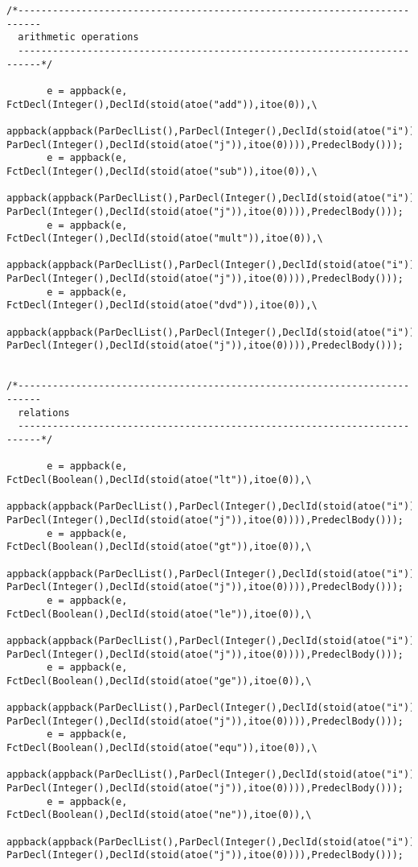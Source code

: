 \begin{verbatim}
/*--------------------------------------------------------------------------
  arithmetic operations 
  --------------------------------------------------------------------------*/

       e = appback(e, FctDecl(Integer(),DeclId(stoid(atoe("add")),itoe(0)),\
 appback(appback(ParDeclList(),ParDecl(Integer(),DeclId(stoid(atoe("i")),itoe(0)))),\
ParDecl(Integer(),DeclId(stoid(atoe("j")),itoe(0)))),PredeclBody()));
       e = appback(e, FctDecl(Integer(),DeclId(stoid(atoe("sub")),itoe(0)),\
 appback(appback(ParDeclList(),ParDecl(Integer(),DeclId(stoid(atoe("i")),itoe(0)))),
ParDecl(Integer(),DeclId(stoid(atoe("j")),itoe(0)))),PredeclBody()));
       e = appback(e, FctDecl(Integer(),DeclId(stoid(atoe("mult")),itoe(0)),\
 appback(appback(ParDeclList(),ParDecl(Integer(),DeclId(stoid(atoe("i")),itoe(0)))),\
ParDecl(Integer(),DeclId(stoid(atoe("j")),itoe(0)))),PredeclBody()));
       e = appback(e, FctDecl(Integer(),DeclId(stoid(atoe("dvd")),itoe(0)),\
 appback(appback(ParDeclList(),ParDecl(Integer(),DeclId(stoid(atoe("i")),itoe(0)))),\
ParDecl(Integer(),DeclId(stoid(atoe("j")),itoe(0)))),PredeclBody()));


/*--------------------------------------------------------------------------
  relations 
  --------------------------------------------------------------------------*/

       e = appback(e, FctDecl(Boolean(),DeclId(stoid(atoe("lt")),itoe(0)),\
 appback(appback(ParDeclList(),ParDecl(Integer(),DeclId(stoid(atoe("i")),itoe(0)))),\
ParDecl(Integer(),DeclId(stoid(atoe("j")),itoe(0)))),PredeclBody()));
       e = appback(e, FctDecl(Boolean(),DeclId(stoid(atoe("gt")),itoe(0)),\
 appback(appback(ParDeclList(),ParDecl(Integer(),DeclId(stoid(atoe("i")),itoe(0)))),\
ParDecl(Integer(),DeclId(stoid(atoe("j")),itoe(0)))),PredeclBody()));
       e = appback(e, FctDecl(Boolean(),DeclId(stoid(atoe("le")),itoe(0)),\
 appback(appback(ParDeclList(),ParDecl(Integer(),DeclId(stoid(atoe("i")),itoe(0)))),\
ParDecl(Integer(),DeclId(stoid(atoe("j")),itoe(0)))),PredeclBody()));
       e = appback(e, FctDecl(Boolean(),DeclId(stoid(atoe("ge")),itoe(0)),\
 appback(appback(ParDeclList(),ParDecl(Integer(),DeclId(stoid(atoe("i")),itoe(0)))),\
ParDecl(Integer(),DeclId(stoid(atoe("j")),itoe(0)))),PredeclBody()));
       e = appback(e, FctDecl(Boolean(),DeclId(stoid(atoe("equ")),itoe(0)),\
 appback(appback(ParDeclList(),ParDecl(Integer(),DeclId(stoid(atoe("i")),itoe(0)))),\
ParDecl(Integer(),DeclId(stoid(atoe("j")),itoe(0)))),PredeclBody()));
       e = appback(e, FctDecl(Boolean(),DeclId(stoid(atoe("ne")),itoe(0)),\
 appback(appback(ParDeclList(),ParDecl(Integer(),DeclId(stoid(atoe("i")),itoe(0)))),\
ParDecl(Integer(),DeclId(stoid(atoe("j")),itoe(0)))),PredeclBody()));



\end{verbatim}
